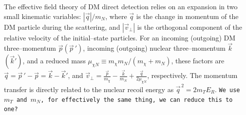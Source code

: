 \documentclass[11pt]{article}
\newcommand{\Eq}[1]{Eq.~(\ref{#1})} \newcommand{\Eqs}[2]{Eqs.~(\ref{#1}) and (\ref{#2})} \newcommand{\Eqm}[2]{Eqs.~(\ref{#1}) through (\ref{#2})}
\newcommand{\sjwColor}{red}
\newcommand{\sjwtt}[1]{{\color{\sjwColor}\tt #1}}
\begin{document}



The effective field theory of DM direct detection \cite{Fitzpatrick:2012ix, Anand:2013yka} relies on an expansion in two small kinematic variables: $|\vec q|/m_N$, where $\vec q$ is the change in momentum of the DM particle during the scattering, and $|\vec v_\perp|$ is the orthogonal component of the relative velocity of the initial--state particles. For an incoming (outgoing) DM three--momentum $\vec p(\vec p\,')$, incoming (outgoing) nuclear three--momentum $\vec k$ $(\vec k')$, and a reduced mass $\mu_{\chi N} \equiv m_\chi m_N/(m_\chi +m_N)$, these factors are $\vec q=\vec p\,'-\vec p=\vec k-\vec k'$, and $\vec v_\perp=\frac{\vec p}{m_\chi}-\frac{\vec k}{m_N}+\frac{\vec q}{2\mu_{\chi N}}$, respectively.
The momentum transfer is directly related to the nuclear recoil energy as $\vec{q}^{\, 2} =2m_TE_R$. \sjwtt{We use $m_T$ and $m_N$, for effectively the same thing, we can reduce this to one?}
\end{document}
